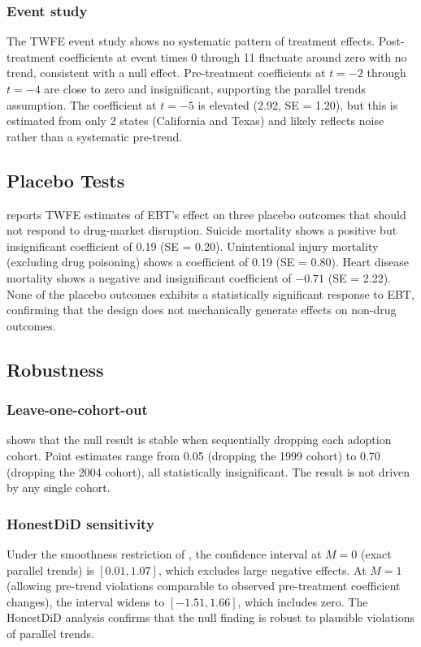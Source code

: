 \documentclass[12pt]{article}
\begin{document}
\subsubsection*{Event study} The TWFE event study shows no systematic pattern of treatment effects. Post-treatment coefficients at event times 0 through 11 fluctuate around zero with no trend, consistent with a null effect. Pre-treatment coefficients at $t=-2$ through $t=-4$ are close to zero and insignificant, supporting the parallel trends assumption. The coefficient at $t=-5$ is elevated (2.92, SE = 1.20), but this is estimated from only 2 states (California and Texas) and likely reflects noise rather than a systematic pre-trend.

\subsection{Placebo Tests}



 reports TWFE estimates of EBT's effect on three placebo outcomes that should not respond to drug-market disruption. Suicide mortality shows a positive but insignificant coefficient of 0.19 (SE = 0.20). Unintentional injury mortality (excluding drug poisoning) shows a coefficient of 0.19 (SE = 0.80). Heart disease mortality shows a negative and insignificant coefficient of $-0.71$ (SE = 2.22). None of the placebo outcomes exhibits a statistically significant response to EBT, confirming that the design does not mechanically generate effects on non-drug outcomes.

\subsection{Robustness}



\subsubsection*{Leave-one-cohort-out}  shows that the null result is stable when sequentially dropping each adoption cohort. Point estimates range from 0.05 (dropping the 1999 cohort) to 0.70 (dropping the 2004 cohort), all statistically insignificant. The result is not driven by any single cohort.

\subsubsection*{HonestDiD sensitivity} Under the smoothness restriction of \citet{rambachan2023more}, the confidence interval at $M = 0$ (exact parallel trends) is $[0.01, 1.07]$, which excludes large negative effects. At $M = 1$ (allowing pre-trend violations comparable to observed pre-treatment coefficient changes), the interval widens to $[-1.51, 1.66]$, which includes zero. The HonestDiD analysis confirms that the null finding is robust to plausible violations of parallel trends.
\end{document}
